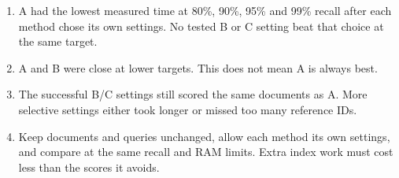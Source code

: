 \begin{enumerate}
\item A had the lowest measured time at 80\%, 90\%, 95\% and 99\% recall after each method chose its own settings. No tested B or C setting beat that choice at the same target.
\item A and B were close at lower targets. This does not mean A is always best.
\item The successful B/C settings still scored the same documents as A. More selective settings either took longer or missed too many reference IDs.
\item Keep documents and queries unchanged, allow each method its own settings, and compare at the same recall and RAM limits. Extra index work must cost less than the scores it avoids.
\end{enumerate}
